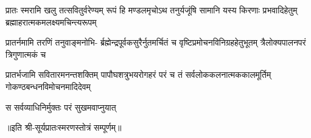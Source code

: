 

\fourlineindentedshloka
{प्रातः स्मरामि खलु तत्सवितुर्वरेण्यम् }
{रूपं हि मण्डलमृचोऽथ तनुर्यजूंषि}
{सामानि यस्य किरणाः प्रभवादिहेतुम्}
{ब्रह्माहरात्मकमलक्ष्यमचिन्त्यरूपम्}

\fourlineindentedshloka
{प्रातर्नमामि तरणिं तनुवाङ्मनोभि-}
{र्ब्रह्मेन्द्रपूर्वकसुरैर्नुतमर्चितं च}
{वृष्टिप्रमोचनविनिग्रहहेतुभूतम्}
{त्रैलोक्यपालनपरं त्रिगुणात्मकं च}

\fourlineindentedshloka
{प्रातर्भजामि सवितारमनन्तशक्तिम्}
{पापौघशत्रुभयरोगहरं परं च}
{तं सर्वलोककलनात्मककालमूर्तिम्}
{गोकण्ठबन्धनविमोचनमादिदेवम्}

{स सर्वव्याधिनिर्मुक्तः परं सुखमवाप्नुयात्}

॥इति श्री-सूर्यप्रातःस्मरणस्तोत्रं सम्पूर्णम्॥